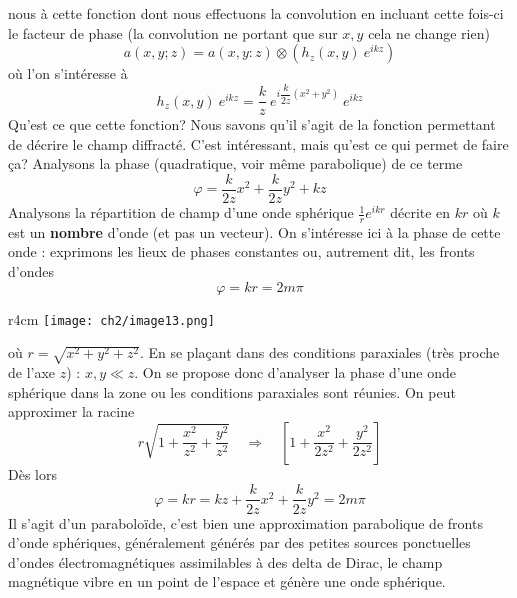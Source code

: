 nous à cette fonction dont nous effectuons la convolution en incluant cette fois-ci le facteur 
de phase (la convolution ne portant que sur $x,y$ cela ne change rien)
\begin{equation}
a(x,y;z) = a(x,y:z)\otimes\left(h_z(x,y)\ e^{ikz}\right)
\end{equation}
où l'on s'intéresse à 
\begin{equation}
h_z(x,y)\ e^{ikz} = \frac{k}{z}\ e^{i\dfrac{k}{2z}(x^2+y^2)}\ e^{ikz}
\end{equation}
Qu'est ce que cette fonction? Nous savons qu'il s'agit de la fonction permettant de décrire 
le champ diffracté. C'est intéressant, mais qu'est ce qui permet de faire ça? Analysons la 
phase (quadratique, voir même parabolique) de ce terme
\begin{equation}
\varphi = \dfrac{k}{2z}x^2+\dfrac{k}{2z}y^2+kz
\end{equation}
Analysons la répartition de champ d'une onde sphérique $\frac{1}{r}e^{ikr}$ décrite en $kr$ 
où $k$ est un \textbf{nombre} d'onde (et pas un vecteur). On s'intéresse ici à la phase de 
cette onde : exprimons les lieux de phases constantes ou, autrement dit, les fronts d'ondes
\begin{equation}
\varphi = kr = 2m\pi
\end{equation}

\begin{wrapfigure}[8]{r}{4cm}
\vspace{-4mm}
\texttt{[image: ch2/image13.png]}
\end{wrapfigure}
où $r = \sqrt{x^2+y^2+z^2}$. En se plaçant dans des conditions paraxiales (très proche de 
l'axe $z$) : $x,y \ll z$. On se propose donc d'analyser la phase d'une onde sphérique dans 
la zone ou les conditions paraxiales sont réunies. On peut approximer la racine
\begin{equation}
r\sqrt{1+\dfrac{x^2}{z^2}+\dfrac{y^2}{z^2}} \quad \Rightarrow \quad\left[1+\dfrac{x^2}{2z^2}+
\dfrac{y^2}{2z^2}\right]
\end{equation}
Dès lors
\begin{equation}
\varphi = kr = kz+ \dfrac{k}{2z}x^2+\dfrac{k}{2z}y^2 = 2m\pi
\end{equation}
Il s'agit d'un paraboloïde, c'est bien une approximation parabolique de fronts d'onde 
sphériques, généralement générés par des petites sources ponctuelles d'ondes électromagnétiques 
assimilables à des delta de Dirac, le champ magnétique vibre en un point de l'espace et 
génère une onde sphérique.\\

